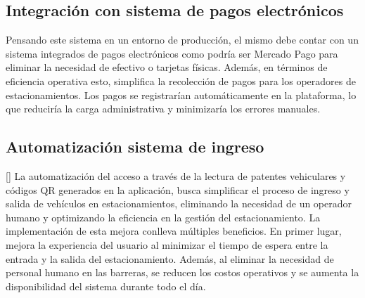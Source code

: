 
\subsection{Integración con sistema de pagos electrónicos}

Pensando este sistema en un entorno de producción, el mismo debe contar con un sistema integrados de pagos electrónicos como podría ser Mercado Pago para eliminar la necesidad de efectivo o tarjetas físicas. Además, en términos de eficiencia operativa esto, simplifica la recolección de pagos para los operadores de estacionamientos. Los pagos se registrarían automáticamente en la plataforma, lo que reduciría la carga administrativa y minimizaría los errores manuales.

\subsection{Automatización sistema de ingreso}
[\label{automatizacion_ingreso}]
La automatización del acceso a través de la lectura de patentes vehiculares y códigos QR generados en la aplicación, busca simplificar el proceso de ingreso y salida de vehículos en estacionamientos, eliminando la necesidad de un operador humano y optimizando la eficiencia en la gestión del estacionamiento. La implementación de esta mejora conlleva múltiples beneficios. En primer lugar, mejora la experiencia del usuario al minimizar el tiempo de espera entre la entrada y la salida del estacionamiento. Además, al eliminar la necesidad de personal humano en las barreras, se reducen los costos operativos y se aumenta la disponibilidad del sistema durante todo el día.
